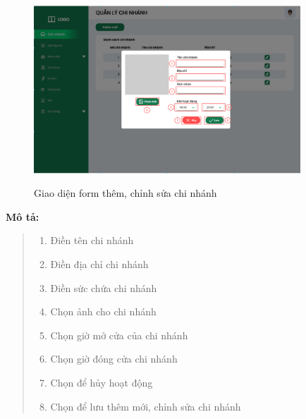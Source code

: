                 \begin{figure}[!htp]
                    \centering
                    \includegraphics[width=10cm]{img/UI/admin/branch_add-edit.png}
                    \label{20}
                    \newline
                    \caption{Giao diện form thêm, chỉnh sửa chi nhánh}
                \end{figure}
                \textbf{Mô tả:}  
                \begin{quote}
                    \begin{enumerate}
                        \item Điền tên chi nhánh
                        \item Điền địa chỉ chi nhánh
                        \item Điền sức chứa chi nhánh
                        \item Chọn ảnh cho chi nhánh
                        \item Chọn giờ mở cửa của chi nhánh
                        \item Chọn giờ đóng cửa chi nhánh
                        \item Chọn để hủy hoạt động
                        \item Chọn để lưu thêm mới, chỉnh sửa chi nhánh
                    \end{enumerate}
                \end{quote}
        
